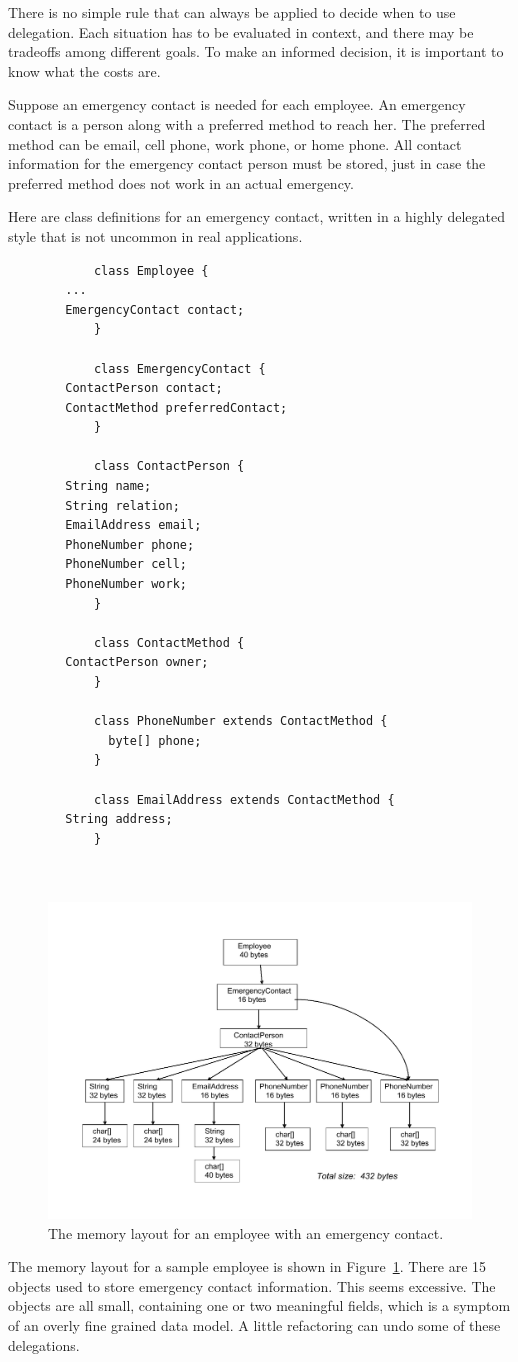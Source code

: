 There is no simple rule that can always be applied to decide when to use delegation. Each situation has to be evaluated in context, and there may be tradeoffs among different goals. To make an informed decision, it is important to know what the costs are.

\begin{example} 
Suppose an emergency contact is needed for each employee. An emergency contact is a person along with a preferred method to reach her.  The preferred method can be email, cell phone, work phone, or home phone. All contact information for the emergency contact person must be stored, just in case the preferred method does not work in an actual emergency. 
\end{example}
Here are class definitions for an emergency contact, written in a highly delegated style that is not uncommon in real applications. 

\ttfamily
\begin{verbatim} 
			class Employee {
        ...
        EmergencyContact contact;
			}
			
			class EmergencyContact {
        ContactPerson contact;
        ContactMethod preferredContact;
			}
			
			class ContactPerson {
        String name;
        String relation;
        EmailAddress email;
        PhoneNumber phone;
        PhoneNumber cell;
        PhoneNumber work;
			}
			
			class ContactMethod {
        ContactPerson owner;
			}
			
			class PhoneNumber extends ContactMethod {
			  byte[] phone;
			}
			
			class EmailAddress extends ContactMethod {
        String address;
			}
			
			
\end{verbatim}
\normalfont
 \begin{figure}
  \centering
 \includegraphics[width=.70\textwidth]{Figures/chapter4/employee-status-fine-grained.pdf}
  \caption{The memory layout for an employee with an emergency contact.}
  \label{fig:employee-status-fine-grained}
\end{figure}
The memory layout for a sample employee is shown in Figure~\ref{fig:employee-status-fine-grained}. There are 15 objects used to store emergency contact information. This seems excessive. The objects are all small, containing one or two meaningful fields, which is a symptom of an overly fine grained data model. A little refactoring can undo some of these delegations.

